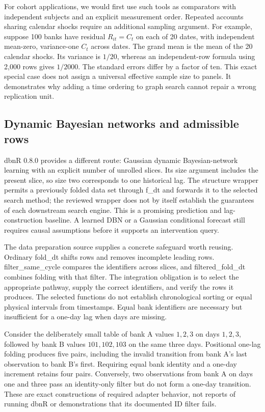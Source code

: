 For cohort applications, we would first use such tools as comparators with
independent subjects and an explicit measurement order. Repeated accounts sharing
calendar shocks require an additional sampling argument. For example, suppose
100 banks have residual \(R_{it}=C_t\) on each of 20 dates, with independent
mean-zero, variance-one \(C_t\) across dates. The grand mean is the mean of the
20 calendar shocks. Its variance is \(1/20\), whereas an independent-row formula
using 2,000 rows gives \(1/2000\). The standard errors differ by a factor of ten.
This exact special case does not assign a universal effective sample size to
panels. It demonstrates why adding a time ordering to graph search cannot repair
a wrong replication unit. \citep{exec14_rtime_exact}

\subsection{Dynamic Bayesian networks and admissible rows}

dbnR 0.8.0 provides a different route: Gaussian dynamic Bayesian-network learning
with an explicit number of unrolled slices. Its size argument includes the
present slice, so size two corresponds to one historical lag. The structure
wrapper permits a previously folded data set through f\_dt and forwards it to
the selected search method; the reviewed wrapper does not by itself establish
the guarantees of each downstream search engine. This is a promising prediction
and lag-construction baseline. A learned DBN or a Gaussian conditional forecast
still requires causal assumptions before it supports an intervention query.
\citep{exec14_rtime_dbnr}

The data preparation source supplies a concrete safeguard worth reusing.
Ordinary fold\_dt shifts rows and removes incomplete leading rows.
filter\_same\_cycle compares the identifiers across slices, and
filtered\_fold\_dt combines folding with that filter. The integration obligation
is to select the appropriate pathway, supply the correct identifiers, and verify
the rows it produces. The selected functions do not establish chronological
sorting or equal physical intervals from timestamps. Equal bank identifiers
are necessary but insufficient for a one-day lag when days are missing.
\citep{exec14_rtime_dbnr}

Consider the deliberately small table of bank A values \(1,2,3\) on days
\(1,2,3\), followed by bank B values \(101,102,103\) on the same three days.
Positional one-lag folding produces five pairs, including the invalid transition
from bank A's last observation to bank B's first. Requiring equal bank identity
and a one-day increment retains four pairs. Conversely, two observations from
bank A on days one and three pass an identity-only filter but do not form a
one-day transition. These are exact constructions of required adapter behavior,
not reports of running dbnR or demonstrations that its documented ID filter
fails. \citep{exec14_rtime_exact}

